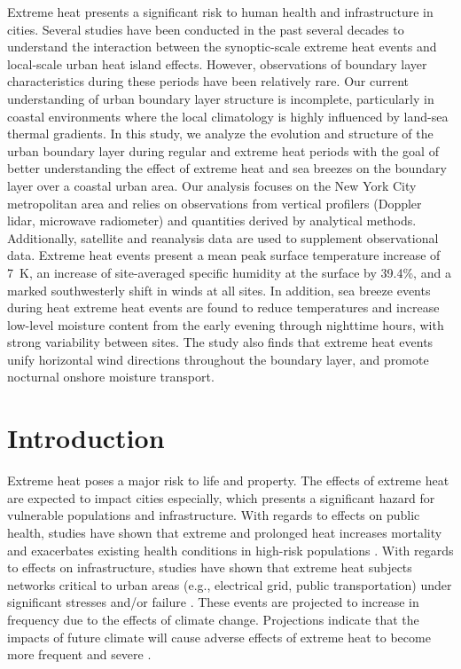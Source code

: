 \documentclass[11pt,a4paper]{article}
\begin{document}
Extreme heat presents a significant risk to human health and infrastructure in cities. Several studies have been conducted in the past several decades to understand the interaction between the synoptic-scale extreme heat events and local-scale urban heat island effects. However, observations of boundary layer characteristics during these periods have been relatively rare. Our current understanding of urban boundary layer structure is incomplete, particularly in coastal environments where the local climatology is highly influenced by land-sea thermal gradients. In this study, we analyze the evolution and structure of the urban boundary layer during regular and extreme heat periods with the goal of better understanding the effect of extreme heat and sea breezes on the boundary layer over a coastal urban area. Our analysis focuses on the New York City metropolitan area and relies on observations from vertical profilers (Doppler lidar, microwave radiometer) and quantities derived by analytical methods. Additionally, satellite and reanalysis data are used to supplement observational data. Extreme heat events present a mean peak surface temperature increase of \SI{7}{\kelvin}, an increase of site-averaged specific humidity at the surface by 39.4\%, and a marked southwesterly shift in winds at all sites. In addition, sea breeze events during heat extreme heat events are found to reduce temperatures and increase low-level moisture content from the early evening through nighttime hours, with strong variability between sites. The study also finds that extreme heat events unify horizontal wind directions throughout the boundary layer, and promote nocturnal onshore moisture transport. 

\section{Introduction}

Extreme heat poses a major risk to life and property. The effects of extreme heat are expected to impact cities especially, which presents a significant hazard for vulnerable populations and infrastructure. With regards to effects on public health, studies have shown that extreme and prolonged heat increases mortality and exacerbates existing health conditions in high-risk populations \citep{anderson2011, frumkin2016, heaviside2017, madrigano2015}. With regards to effects on infrastructure, studies have shown that extreme heat subjects networks critical to urban areas (e.g., electrical grid, public transportation) under significant stresses and/or failure \citep{mcevoy2012, zuo2015}. These events are projected to increase in frequency due to the effects of climate change. Projections indicate that the impacts of future climate will cause adverse effects of extreme heat to become more frequent and severe \citep{burillo2019, forzieri2018, peng2011}.
\end{document}
